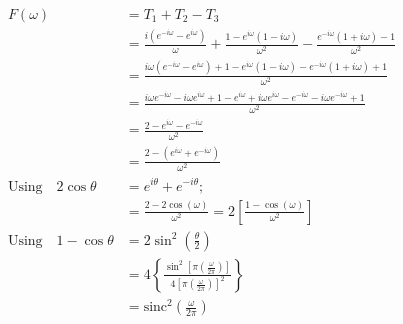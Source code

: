 \documentclass[preview]{standalone}
\begin{document}
\begin{align*}
F(\omega)&=T_{1}+T_{2}-T_{3} \\ &=\frac{i(e^{-i\omega}-e^{i\omega})}{\omega}+\frac{1-e^{i\omega}(1-i\omega)}{\omega^{2}}-\frac{e^{-i\omega}(1+i\omega)-1}{\omega^{2}} \\ &=\frac{i\omega(e^{-i\omega}-e^{i\omega})+1-e^{i\omega}(1-i\omega)-e^{-i\omega}(1+i\omega)+1}{\omega^{2}} \\ &=\frac{i\omega e^{-i\omega}-i\omega e^{i\omega}+1-e^{i\omega}+i\omega e^{i\omega}-e^{-i\omega}-i\omega e^{-i\omega}+1}{\omega^{2}} \\ &=\frac{2-e^{i\omega} - e^{-i\omega}}{\omega^{2}} \\ &=\frac{2-(e^{i\omega}+e^{-i\omega})}{\omega^{2}} \quad \\ \textrm{Using} \quad 2\cos{\theta}&=e^{i\theta}+e^{-i\theta}; \\ &=\frac{2-2\cos{(\omega)}}{\omega^{2}} = 2\left[\frac{1-\cos{(\omega)}}{\omega^{2}}\right] \\ \textrm{Using} \quad 1-\cos{\theta}&=2\sin^{2}{\left( \frac{\theta}{2} \right) } \\ &=4\left\{ \frac{\sin^{2}{\left[ \pi \left( \frac{\omega}{2\pi} \right) \right]}}{4\left[ \pi \left( \frac{\omega}{2\pi} \right) \right]^{2} } \right\} \\ &=\textrm{sinc}^{2}\left( \frac{\omega}{2\pi} \right)
\end{align*}
\end{document}
